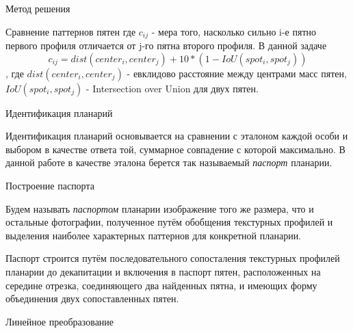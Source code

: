 \documentclass{article}
\begin{document}
\begin{section}{Метод решения}
\begin{subsection}{Сравнение паттернов пятен}
где $c_{ij}$ - мера того, насколько сильно i-е пятно первого профиля отличается от j-го пятна второго профиля. В данной задаче \[c_{ij} = dist(center_i, center_j) +  10 * (1 - IoU(spot_i, spot_j))\]
, где $dist(center_i, center_j)$ - евклидово расстояние между центрами масс пятен, $IoU(spot_i, spot_j)$ - Intersection over Union для двух пятен. 

    
\end{subsection}

\begin{subsection}{Идентификация планарий}

Идентификация планарий основывается на сравнении с эталоном каждой особи и выбором в качестве ответа той, суммарное совпадение с которой максимально.
В данной работе в качестве эталона берется так называемый \textit{паспорт} планарии.

\begin{subsubsection}{Построение паспорта}

Будем называть \textit{паспортом} планарии изображение того же размера, что и остальные фотографии, полученное путём обобщения текстурных профилей и выделения наиболее характерных паттернов для конкретной планарии.

Паспорт строится путём последовательного сопосталения текстурных профилей планарии до декапитации и включения в паспорт пятен, расположенных на середине отрезка, соединяющего два найденных пятна, и имеющих форму объединения двух сопоставленных пятен.

\end{subsubsection}

\begin{subsubsection}{Линейное преобразование}


\end{subsubsection}
\end{subsection}
\end{section}
\end{document}
